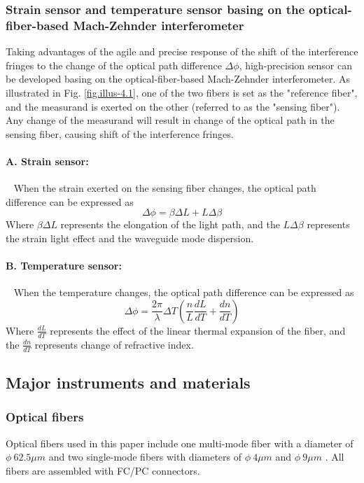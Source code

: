 \documentclass[10pt,a4paper,twocolumn,twoside,UTF8]{article}
\begin{document}
		\subsubsection{Strain sensor and temperature sensor basing on the optical-fiber-based Mach-Zehnder interferometer}
		Taking advantages of the agile and precise response of the shift of the interference fringes to the change of the optical path difference $\Delta \phi$, high-precision sensor can be developed basing on the optical-fiber-based Mach-Zehnder interferometer. 
		As illustrated in Fig. \ref{fig.illus-4.1}, one of the two fibers is set as the "reference fiber", and the measurand is exerted on the other (referred to as the "sensing fiber"). Any change of the measurand will result in change of the optical path in the sensing fiber, causing shift of the interference fringes.
		\paragraph{A. Strain sensor:}~
		\newline 
		\indent
		When the strain exerted on the sensing fiber changes, the optical path difference can be expressed as
		\begin{equation}
			\Delta \phi = \beta \Delta L+ L\Delta \beta
			\label{eq.6.1}
		\end{equation}
		Where $\beta \Delta L$ represents the elongation of the light path, and the $L\Delta \beta$ represents the strain light effect and the waveguide mode dispersion.

		\paragraph{B. Temperature sensor:}~
		\newline 
		\indent
		When the temperature changes, the optical path difference can be expressed as
		\begin{equation}
			\Delta \phi = \frac{2\pi}{\lambda} \Delta T(\frac{n}{L}\frac{dL}{dT}+ \frac{dn}{dT})
			\label{eq.6.2}
		\end{equation}
		Where $\frac{dL}{dT}$ represents the effect of the linear thermal expansion of the fiber, and the $\frac{dn}{dT}$ represents change of refractive index.

	\subsection{Major instruments and materials}
	\subsubsection{Optical fibers}
	Optical fibers used in this paper include one multi-mode fiber with a diameter of $\phi \ 62.5\mu m$ and two single-mode fibers with diameters of $\phi \ 4\mu m$  and $\phi \ 9\mu m$ . 
	All fibers are assembled with FC/PC connectors.
\end{document}

